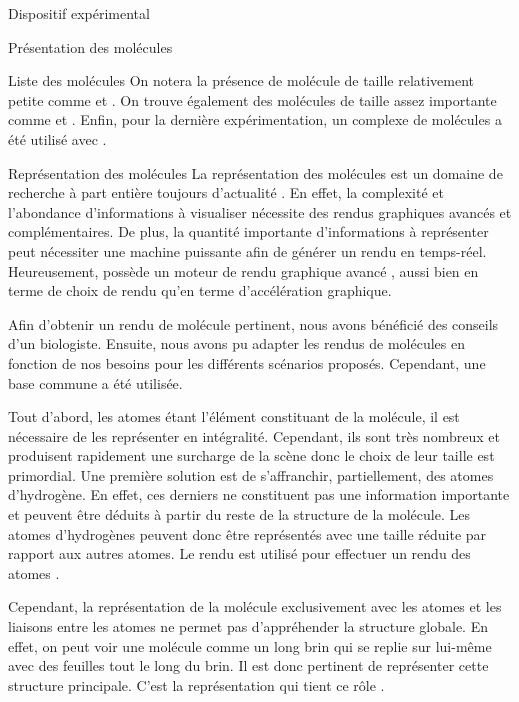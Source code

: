 \documentclass[myfrancais,ngerman,english,frenchb]{mythesis}
\begin{document}
\begin{mychapter}{Dispositif expérimental}
\begin{mysection}{Présentation des molécules}
\begin{mysubsection}{Liste des molécules}
				On notera la présence de molécule de taille relativement petite comme \myTRPZIPPER et \myTRPCAGE.
				On trouve également des molécules de taille assez importante comme \myPrion et \myUbiquitin.
				Enfin, pour la dernière expérimentation, un complexe de molécules a été utilisé avec \myNusENusG.
			\end{mysubsection}
			\begin{mysubsection}{Représentation des molécules}
				La représentation des molécules est un domaine de recherche à part entière toujours d'actualité .
				En effet, la complexité et l'abondance d'informations à visualiser nécessite des rendus graphiques avancés et complémentaires.
				De plus, la quantité importante d'informations à représenter peut nécessiter une machine puissante afin de générer un rendu en temps-réel.
				Heureusement,  possède un moteur de rendu graphique avancé , aussi bien en terme de choix de rendu qu'en terme d'accélération graphique.

				Afin d'obtenir un rendu de molécule pertinent, nous avons bénéficié des conseils d'un biologiste.
				Ensuite, nous avons pu adapter les rendus de molécules en fonction de nos besoins pour les différents scénarios proposés.
				Cependant, une base commune a été utilisée.

				Tout d'abord, les atomes étant l'élément constituant de la molécule, il est nécessaire de les représenter en intégralité.
				Cependant, ils sont très nombreux et produisent rapidement une surcharge de la scène donc le choix de leur taille est primordial.
				Une première solution est de s'affranchir, partiellement, des atomes d'hydrogène.
				En effet, ces derniers ne constituent pas une information importante et peuvent être déduits à partir du reste de la structure de la molécule.
				Les atomes d'hydrogènes peuvent donc être représentés avec une taille réduite par rapport aux autres atomes.
				Le rendu \myCPK est utilisé pour effectuer un rendu des atomes .

				\begin{myfigure}
				\end{myfigure}

				Cependant, la représentation de la molécule exclusivement avec les atomes et les liaisons entre les atomes ne permet pas d'appréhender la structure globale.
				En effet, on peut voir une molécule comme un long brin qui se replie sur lui-même avec des feuilles tout le long du brin.
				Il est donc pertinent de représenter cette structure principale.
				C'est la représentation \myNewRibbon qui tient ce rôle .


\end{mysubsection}
\end{mysection}
\end{mychapter}
\end{document}
